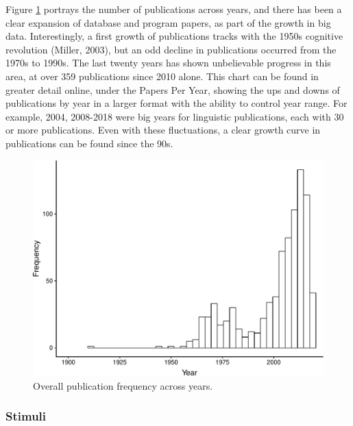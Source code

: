 \documentclass[english,,man]{apa6}
\theoremstyle{definition}
\theoremstyle{definition}
\theoremstyle{definition}
\theoremstyle{remark}
\begin{document}
Figure \ref{fig:pub-fig} portrays the number of publications across
years, and there has been a clear expansion of database and program
papers, as part of the growth in big data. Interestingly, a first growth
of publications tracks with the 1950s cognitive revolution (Miller,
2003), but an odd decline in publications occurred from the 1970s to
1990s. The last twenty years has shown unbelievable progress in this
area, at over 359 publications since 2010 alone. This chart can be found
in greater detail online, under the Papers Per Year, showing the ups and
downs of publications by year in a larger format with the ability to
control year range. For example, 2004, 2008-2018 were big years for
linguistic publications, each with 30 or more publications. Even with
these fluctuations, a clear growth curve in publications can be found
since the 90s.

\begin{figure}
\centering
\includegraphics{LAB_files/figure-latex/pub-fig-1.pdf}
\caption{\label{fig:pub-fig}Overall publication frequency across years.}
\end{figure}

\hypertarget{stimuli}{%
\subsubsection{Stimuli}\label{stimuli}}
\end{document}

